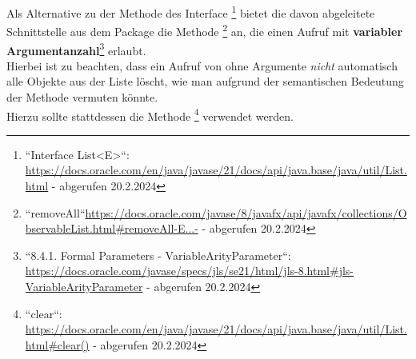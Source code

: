 Als Alternative zu der Methode  des Interface \footnote{
``Interface List<E>``: \url{https://docs.oracle.com/en/java/javase/21/docs/api/java.base/java/util/List.html} - abgerufen 20.2.2024
} bietet die davon abgeleitete Schnittstelle  aus dem Package  die Methode
\footnote{
    ``removeAll``\url{https://docs.oracle.com/javase/8/javafx/api/javafx/collections/ObservableList.html#removeAll-E...-} - abgerufen 20.2.2024
} an, die einen Aufruf mit \textbf{variabler Argumentanzahl}\footnote{
    ``8.4.1. Formal Parameters - VariableArityParameter``:  \url{https://docs.oracle.com/javase/specs/jls/se21/html/jls-8.html#jls-VariableArityParameter} - abgerufen 20.2.2024
} erlaubt.\\

\noindent
Hierbei ist zu beachten, dass ein Aufruf von  ohne Argumente \textit{nicht} automatisch alle Objekte aus der Liste löscht, wie man aufgrund der semantischen Bedeutung der Methode vermuten könnte.\\
Hierzu sollte stattdessen die Methode \footnote{
``clear``: \url{https://docs.oracle.com/en/java/javase/21/docs/api/java.base/java/util/List.html#clear()} - abgerufen 20.2.2024
} verwendet werden.
